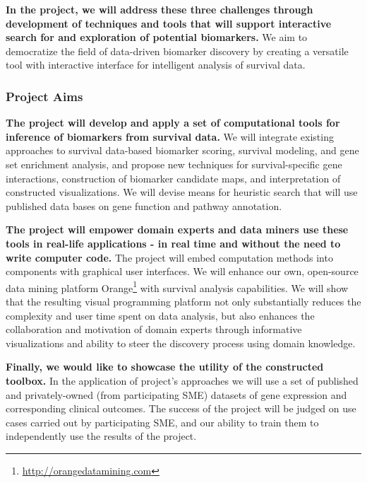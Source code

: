 \documentclass[11pt,a4paper]{article}
\newcommand{\myurl}[1]{\footnote{\url{#1}}}
\renewcommand{\bold}{\textbf}
\begin{document}
\bold{In the project, we will address these three challenges through development of techniques and tools that will support interactive search for and exploration of potential biomarkers.} We aim to democratize the field of data-driven biomarker discovery by creating a versatile tool with interactive interface for intelligent analysis of survival data.

\subsubsection*{Project Aims}

\bold{The project will develop and apply a set of computational tools for inference of biomarkers from survival data.} We will integrate existing approaches to survival data-based biomarker scoring, survival modeling, and gene set enrichment analysis, and propose new techniques for survival-specific gene interactions, construction of biomarker candidate maps, and interpretation of constructed visualizations. We will devise means for heuristic search that will use published data bases on gene function and pathway annotation.

\bold{The project will empower domain experts and data miners use these tools in real-life applications - in real time and without the need to write computer code.} The project will embed computation methods into components with graphical user interfaces. We will enhance our own, open-source data mining platform Orange\myurl{http://orangedatamining.com} with survival analysis capabilities. We will show that the resulting visual programming platform not only substantially reduces the complexity and user time spent on data analysis, but also enhances the collaboration and motivation of domain experts through informative visualizations and ability to steer the discovery process using domain knowledge. 

\bold{Finally, we would like to showcase the utility of the constructed toolbox.} In the application of project's approaches we will use a set of published and privately-owned (from participating SME) datasets of gene expression and corresponding clinical outcomes. The success of the project will be judged on use cases carried out by participating SME, and our ability to train them to independently use the results of the project.
\end{document}
